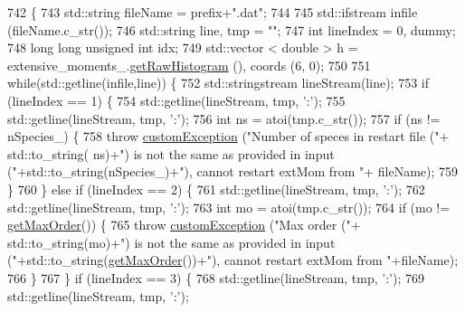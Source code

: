 \begin{DoxyCode}
742                                                                                          \{
743     std::string fileName = prefix+\textcolor{stringliteral}{".dat"};
744 
745     std::ifstream infile (fileName.c\_str());
746     std::string line, tmp = \textcolor{stringliteral}{""};
747     \textcolor{keywordtype}{int} lineIndex = 0, dummy;
748     \textcolor{keywordtype}{long} \textcolor{keywordtype}{long} \textcolor{keywordtype}{unsigned} \textcolor{keywordtype}{int} idx;
749     std::vector < double > h = extensive\_moments\_.\hyperlink{classhistogram_afa81289dc32207eb3c44f8bd746f0d1d}{getRawHistogram} (), coords (6, 0);
750 
751     \textcolor{keywordflow}{while}(std::getline(infile,line)) \{
752         std::stringstream lineStream(line);
753         \textcolor{keywordflow}{if} (lineIndex == 1) \{
754             std::getline(lineStream, tmp, \textcolor{charliteral}{':'});
755             std::getline(lineStream, tmp, \textcolor{charliteral}{':'});
756             \textcolor{keywordtype}{int} ns = atoi(tmp.c\_str());
757             \textcolor{keywordflow}{if} (ns != nSpecies\_) \{
758                 \textcolor{keywordflow}{throw} \hyperlink{classcustom_exception}{customException} (\textcolor{stringliteral}{"Number of speces in restart file ("}+ std::to\_string(
      ns)+\textcolor{stringliteral}{") is not the same as provided in input ("}+std::to\_string(nSpecies\_)+\textcolor{stringliteral}{"), cannot restart extMom from "}+
      fileName);
759             \}
760         \} \textcolor{keywordflow}{else} \textcolor{keywordflow}{if} (lineIndex == 2) \{
761             std::getline(lineStream, tmp, \textcolor{charliteral}{':'});
762             std::getline(lineStream, tmp, \textcolor{charliteral}{':'});
763             \textcolor{keywordtype}{int} mo = atoi(tmp.c\_str());
764             \textcolor{keywordflow}{if} (mo != \hyperlink{classsim_system_afe08187d318113c33bda890c69570c36}{getMaxOrder}()) \{
765                 \textcolor{keywordflow}{throw} \hyperlink{classcustom_exception}{customException} (\textcolor{stringliteral}{"Max order ("}+ std::to\_string(mo)+\textcolor{stringliteral}{") is not the same
       as provided in input ("}+std::to\_string(\hyperlink{classsim_system_afe08187d318113c33bda890c69570c36}{getMaxOrder}())+\textcolor{stringliteral}{"), cannot restart extMom from "}+fileName);
766             \}
767         \} \textcolor{keywordflow}{if} (lineIndex == 3) \{
768             std::getline(lineStream, tmp, \textcolor{charliteral}{':'});
769             std::getline(lineStream, tmp, \textcolor{charliteral}{':'});

\end{DoxyCode}
